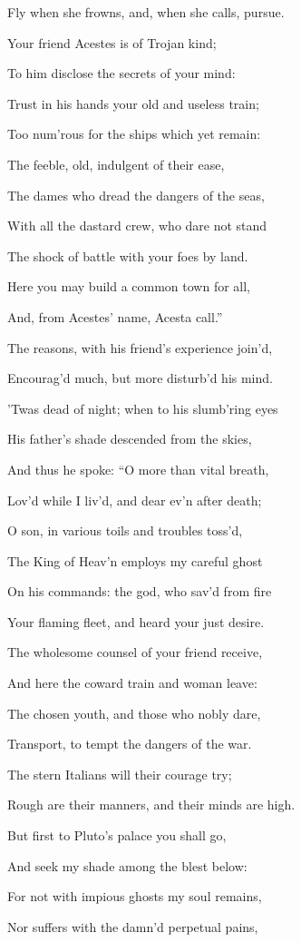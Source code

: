 Fly when she frowns, and, when she calls, pursue.

Your friend Acestes is of Trojan kind;

To him disclose the secrets of your mind:

Trust in his hands your old and useless train;

Too num’rous for the ships which yet remain:

The feeble, old, indulgent of their ease,

The dames who dread the dangers of the seas,

With all the dastard crew, who dare not stand

The shock of battle with your foes by land.

Here you may build a common town for all,

And, from Acestes’ name, Acesta call.”

The reasons, with his friend’s experience join’d,

Encourag’d much, but more disturb’d his mind.

’Twas dead of night; when to his slumb’ring eyes

His father’s shade descended from the skies,

And thus he spoke: “O more than vital breath,

Lov’d while I liv’d, and dear ev’n after death;

O son, in various toils and troubles toss’d,

The King of Heav’n employs my careful ghost

On his commands: the god, who sav’d from fire

Your flaming fleet, and heard your just desire.

The wholesome counsel of your friend receive,

And here the coward train and woman leave:

The chosen youth, and those who nobly dare,

Transport, to tempt the dangers of the war.

The stern Italians will their courage try;

Rough are their manners, and their minds are high.

But first to Pluto’s palace you shall go,

And seek my shade among the blest below:

For not with impious ghosts my soul remains,

Nor suffers with the damn’d perpetual pains,


